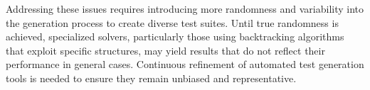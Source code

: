 Addressing these issues requires introducing more randomness and variability into the generation process to create diverse test suites. Until true randomness is achieved, specialized solvers, particularly those using backtracking algorithms that exploit specific structures, may yield results that do not reflect their performance in general cases. Continuous refinement of automated test generation tools is needed to ensure they remain unbiased and representative.